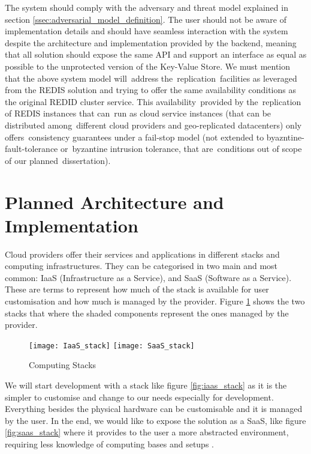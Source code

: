 The system should comply with the adversary and threat model explained in section \ref{ssec:adversarial_model_definition}. The user should not be aware of implementation details and should have seamless interaction with the system despite the architecture and implementation provided by the backend, meaning that all solution should expose the same \gls{API} and support an interface as equal as possible to the unprotected version of the Key-Value Store. We must mention that the above system model will address the replication facilities as leveraged from the REDIS solution and trying to offer the same availability conditions as the original REDID cluster service. This availability provided by the replication of REDIS instances that can run as cloud service instances (that can be distributed among different cloud providers and geo-replicated datacenters) only offers consistency guarantees under a fail-stop model (not extended to byazntine-fault-tolerance or byzantine intrusion tolerance, that are conditions out of scope of our planned dissertation).

\section{Planned Architecture and Implementation} %
\label{sec:planned_architecture_and_implementation}

Cloud providers offer their services and applications in different stacks and computing infrastructures. They can be categorised in two main and most common: \gls{IaaS} (Infrastructure as a Service), and \gls{SaaS} (Software as a Service). These are terms to represent how much of the stack is available for user customisation and how much is managed by the provider. Figure \ref{fig:computing_stacks} shows the two stacks that where the shaded components represent the ones managed by the provider.

\begin{figure}[htbp]
  \centering
    {\texttt{[image: IaaS\_stack]}}%
    \hspace{5em}
    {\texttt{[image: SaaS\_stack]}}%
  \caption{Computing Stacks}
  \label{fig:computing_stacks}
\end{figure}

We will start development with a stack like figure \ref{fig:iaas_stack} as it is the simpler to customise and change to our needs especially for development. Everything besides the physical hardware can be customisable and it is managed by the user. In the end, we would like to expose the solution as a \gls{SaaS}, like figure \ref{fig:saas_stack} where it provides to the user a more abstracted environment, requiring less knowledge of computing bases and setups \cite{computing_stacks:1}.

